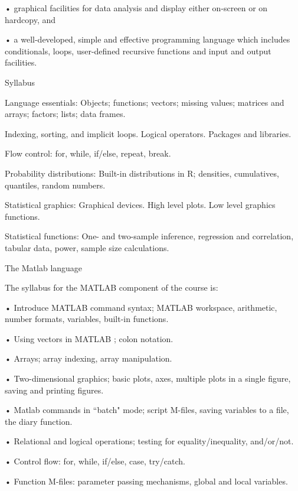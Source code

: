 •
graphical facilities for data analysis and display either on-screen or on hardcopy, and

•
a well-developed, simple and effective programming language which includes conditionals, loops, user-defined recursive functions and input and output facilities.



Syllabus

Language essentials: Objects; functions; vectors; missing values; matrices and arrays; factors; lists; data frames. 

Indexing, sorting, and implicit loops. Logical operators. Packages and libraries.  

Flow control: for, while, if/else, repeat, break. 

Probability distributions: Built-in distributions in R; densities, cumulatives, quantiles, random numbers. 

Statistical graphics: Graphical devices. High level plots. Low level graphics functions. 

Statistical functions: One- and two-sample inference, regression and correlation, tabular data, power, sample size calculations.


















The Matlab language


The syllabus for the MATLAB component of the course is:

•
Introduce MATLAB command syntax; MATLAB workspace, arithmetic, number formats, variables, built-in functions.

•
Using vectors in MATLAB ; colon notation.

•
Arrays; array indexing, array manipulation.

•
Two-dimensional graphics; basic plots, axes, multiple plots in a single figure, saving and printing figures.

•
Matlab commands in “batch" mode; script M-files, saving variables to a file, the diary function.

•
Relational and logical operations; testing for equality/inequality, and/or/not.

•
Control flow: for, while, if/else, case, try/catch.

•
Function M-files: parameter passing mechanisms, global and local variables.



